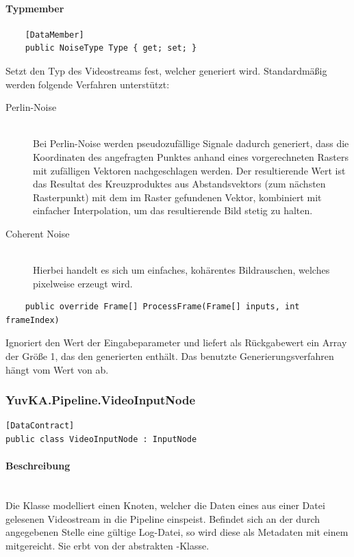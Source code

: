 \paragraph{Typmember}
\begin{itemize}

	\begin{verbatim}
	[DataMember]
	public NoiseType Type { get; set; }
	\end{verbatim}
	Setzt den Typ des Videostreams fest, welcher generiert wird. Standardmäßig werden folgende Verfahren unterstützt:
	\begin{description}
		\item[Perlin-Noise]~\\
		Bei Perlin-Noise werden pseudozufällige Signale dadurch generiert, dass die Koordinaten des angefragten Punktes anhand eines vorgerechneten Rasters mit zufälligen Vektoren nachgeschlagen werden. Der resultierende Wert ist das Resultat des Kreuzproduktes aus Abstandsvektors (zum nächsten Rasterpunkt) mit dem im Raster gefundenen Vektor, kombiniert mit einfacher Interpolation, um das resultierende Bild stetig zu halten.
		\item[Coherent Noise]~\\
		Hierbei handelt es sich um einfaches, kohärentes Bildrauschen, welches pixelweise erzeugt wird.
	\end{description}

	\begin{verbatim}
	public override Frame[] ProcessFrame(Frame[] inputs, int frameIndex)
	\end{verbatim}
	Ignoriert den Wert der Eingabeparameter und liefert als Rückgabewert ein Array der Größe 1, das den generierten  enthält. Das benutzte Generierungsverfahren hängt vom Wert von  ab.


\end{itemize}

\subsubsection{YuvKA.Pipeline.VideoInputNode}

\begin{verbatim}
[DataContract]
public class VideoInputNode : InputNode
\end{verbatim}

\paragraph{Beschreibung}~\\
Die Klasse  modelliert einen Knoten, welcher die Daten eines aus einer Datei gelesenen Videostream in die Pipeline einspeist. Befindet sich an der durch  angegebenen Stelle eine gültige Log-Datei, so wird diese als Metadaten mit einem  mitgereicht. Sie erbt von der abstrakten -Klasse.


